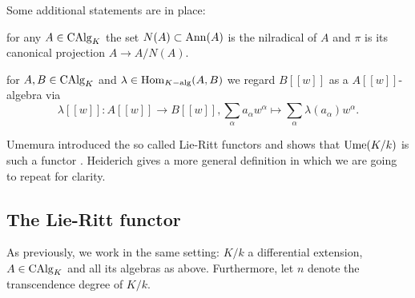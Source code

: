\bmk Some additional statements are in place:
\bn
\item for any $A \in \mathrm{CAlg}_K$ the set $N(A) \subset \mathrm{Ann}(A)$ is the nilradical of $A$ and $\pi$ is its canonical projection $A \longrightarrow A/N(A)$.
\item for $A, B \in \mathrm{CAlg}_K$ and $\lambda \in \mathrm{Hom}_{K-\mathrm{alg}}(A,B)$ we regard $B[[w]]$ as a $A[[w]]$-algebra via
$$\lambda[[w]] : A[[w]] \longrightarrow B[[w]], \sum_{\alpha} a_\alpha w^\alpha \longmapsto \sum_\alpha \lambda(a_\alpha) w^\alpha.$$
\item Umemura introduced the so called Lie-Ritt functors and shows that $\mathrm{Ume}(K/k)$ is such a functor \cite{Ume96,Ume96b}. Heiderich gives a more general definition in \cite{Heid10} which we are going to repeat for clarity.
\en
\subsection{The Lie-Ritt functor}
As previously, we work in the same setting: $K/k$ a differential extension, $A \in \mathrm{CAlg}_K$ and all its algebras as above. Furthermore, let $n$ denote the transcendence degree of $K/k$.
